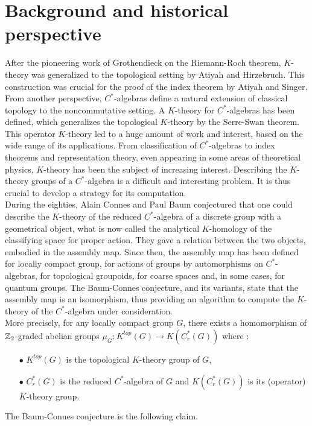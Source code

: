 \section*{Background and historical perspective}

After the pioneering work of Grothendieck on the Riemann-Roch theorem, $K$-theory was generalized to the topological setting by Atiyah and Hirzebruch. This construction was crucial for the proof of the index theorem by Atiyah and Singer. From another perspective, $C^*$-algebras define a natural extension of classical topology to the noncommutative setting. A $K$-theory for $C^*$-algebras has been defined, which generalizes the topological $K$-theory by the Serre-Swan theorem. This operator $K$-theory led to a huge amount of work and interest, based on the wide range of its applications. From classification of $C^*$-algebras to index theorems and representation theory, even appearing in some areas of theoretical physics, $K$-theory has been the subject of increasing interest. Describing the $K$-theory groups of a $C^*$-algebra is a difficult and interesting problem. It is thus crucial to develop a strategy for its computation.\\


During the eighties, Alain Connes and Paul Baum conjectured that one could describe the $K$-theory of the reduced $C^*$-algebra of a discrete group with a geometrical object, what is now called the analytical $K$-homology of the classifying space for proper action. They gave a relation between the two objects, embodied in the assembly map. Since then, the assembly map has been defined for locally compact group, for actions of groups by automorphisms on $C^*$-algebras, for topological groupoids, for coarse spaces and, in some cases, for quantum groups. The Baum-Connes conjecture, and its variants, state that the assembly map is an isomorphism, thus providing an algorithm to compute the $K$-theory of the $C^*$-algebra under consideration.\\

More precisely, for any locally compact group $G$, there exists a homomorphism of $\mathbb Z_2$-graded abelian groups $\mu_G : K^{top}(G)\rightarrow K(C_r^*(G))$ where :\\
\begin{itemize}
\item[$\bullet$] $K^{top}(G)$ is the topological $K$-theory group of $G$,
\item[$\bullet$] $C^*_r(G)$ is the reduced $C^*$-algebra of $G$ and $K(C_r^*(G))$ is its (operator) $K$-theory group.\\
\end{itemize}
The Baum-Connes conjecture is the following claim.

